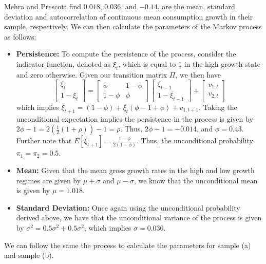 \documentclass[french]{article}
\begin{document}
Mehra and Prescott find $0.018$, $0.036$, and $-0.14$, are the mean, standard deviation and autocorrelation of continuous mean consumption growth in their sample, respectively. We can then calculate the parameters of the Markov process as follows:
\begin{itemize}
	\item \textbf{Persistence:} To compute the persistence of the process, consider the indicator function, denoted as  $\xi_t$, which is equal to $1$ in the high growth state and zero otherwise.  Given our transition matrix $\Pi$, we then have 
	\begin{equation*}
	\begin{bmatrix}
	\xi_{t}\\ 1- \xi_t
	\end{bmatrix} = \begin{bmatrix} 
	\phi & 1-\phi\\1-\phi & \phi
	\end{bmatrix} \begin{bmatrix}
	\xi_{t-1}\\ 1- \xi_{t-1}
	\end{bmatrix}
	+
	\begin{bmatrix}
	v_{1, t}\\ v_{2, t}
	\end{bmatrix}
	\end{equation*}
	which implies $\xi_{t+1} = (1-\phi) + \xi_t(\phi -1 +\phi) + v_{1, t+1}$. Taking the unconditional expectation implies the persistence in the process is given by $2\phi -1 = 2(\frac{1}{2}(1+\rho))-1 = \rho$. Thus, $2\phi -1 = -0.014$, and $\phi = 0.43$. Further note that $E\left[\xi_{t+1}\right] = \frac{1-\phi}{2(1-\phi)}$. Thus, the unconditional probability $\pi_1 = \pi_2 = 0.5$. 
	\item\textbf{Mean:} Given that the mean gross growth rates in the high and low growth regimes are given by $\mu + \sigma$ and $\mu -\sigma$, we know that the unconditional mean is given by $\mu = 1.018$.
	\item \textbf{Standard Deviation:} Once again using the unconditional probability derived above, we have that the unconditional variance of the process is given by	$\sigma^2 = 0.5 \sigma^2 + 0.5\sigma^2$, which implies $\sigma = 0.036$. 
\end{itemize}

We can follow the same the process to calculate the parameters for sample (a) and sample (b). \\


\end{document}
